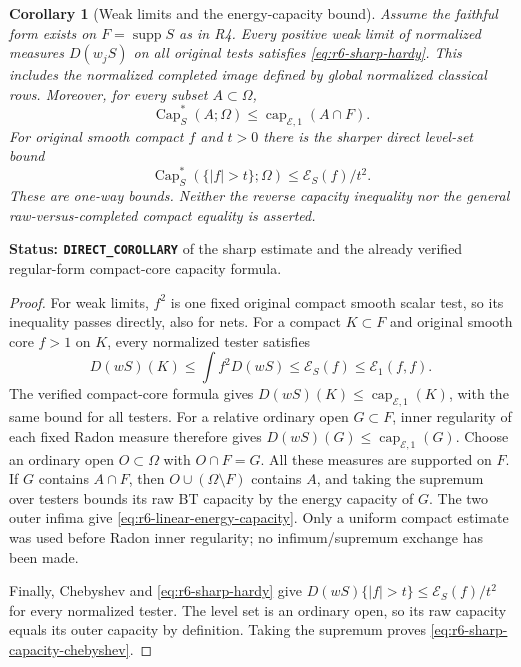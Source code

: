 \documentclass[11pt,a4paper]{article}
\numberwithin{equation}{section}
\newtheorem{corollary}[theorem]{Corollary}
\theoremstyle{definition}
\theoremstyle{remark}
\begin{document}
\begin{corollary}[Weak limits and the energy-capacity bound]
\label{cor:r6-sharp-energy-capacity}
Assume the faithful form exists on $F=\operatorname{supp}S$ as in R4.
Every positive weak limit of normalized measures $D(w_jS)$ on all
original tests satisfies \eqref{eq:r6-sharp-hardy}. This includes the
normalized completed image defined by global normalized classical
rows. Moreover, for every subset $A\subset\Omega$,
\begin{equation}
            \operatorname{Cap}_S^*(A;\Omega)
                  \le\operatorname{cap}_{\mathcal E,1}(A\cap F).
 \label{eq:r6-linear-energy-capacity}
\end{equation}
For original smooth compact $f$ and $t>0$ there is the sharper direct
level-set bound
\begin{equation}
        \operatorname{Cap}_S^*(\{|f|>t\};\Omega)
                          \le\mathcal E_S(f)/t^2.
 \label{eq:r6-sharp-capacity-chebyshev}
\end{equation}
These are one-way bounds. Neither the reverse capacity inequality nor
the general raw-versus-completed compact equality is asserted.
\end{corollary}

\noindent\textbf{Status: \texttt{DIRECT\_COROLLARY}} of the sharp estimate
and the already verified regular-form compact-core capacity formula.

\begin{proof}
For weak limits, $f^2$ is one fixed original compact smooth scalar
test, so its inequality passes directly, also for nets. For a compact
$K\subset F$ and original smooth core $f>1$ on $K$, every normalized
tester satisfies
\[
 D(wS)(K)\le\int f^2D(wS)\le\mathcal E_S(f)
                                      \le\mathcal E_1(f,f).
\]
The verified compact-core formula gives
$D(wS)(K)\le\operatorname{cap}_{\mathcal E,1}(K)$, with the same
bound for all testers. For a relative ordinary open $G\subset F$,
inner regularity of each fixed Radon measure therefore gives
$D(wS)(G)\le\operatorname{cap}_{\mathcal E,1}(G)$.
Choose an ordinary open $O\subset\Omega$ with $O\cap F=G$.
All these measures are supported on $F$. If $G$ contains $A\cap F$,
then $O\cup(\Omega\setminus F)$ contains $A$, and taking the
supremum over testers bounds its raw BT capacity by the energy
capacity of $G$. The two outer infima give
\eqref{eq:r6-linear-energy-capacity}. Only a uniform compact estimate
was used before Radon inner regularity; no infimum/supremum exchange
has been made.

Finally, Chebyshev and \eqref{eq:r6-sharp-hardy} give
$D(wS)\{|f|>t\}\le\mathcal E_S(f)/t^2$ for every normalized
tester. The level set is an ordinary open, so its raw capacity equals
its outer capacity by definition. Taking the supremum proves
\eqref{eq:r6-sharp-capacity-chebyshev}.
\end{proof}
\end{document}
